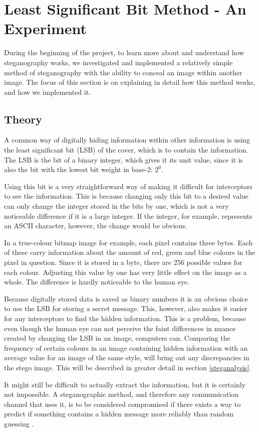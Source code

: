 \section{Least Significant Bit Method - An Experiment}
During the beginning of the project, to learn more about and understand how steganography works, we investigated and implemented a relatively simple method of steganography with the ability to conceal an image within another image.
The focus of this section is on explaining in detail how this method works, and how we implemented it.

\subsection{Theory}
A common way of digitally hiding information within other information is using the least significant bit (LSB) of the cover, which is to contain the information.
The LSB is the bit of a binary integer, which gives it its unit value, since it is also the bit with the lowest bit weight in base-2: $2^0$.

Using this bit is a very straightforward way of making it difficult for interceptors to see the information.
This is because changing only this bit to a desired value can only change the integer stored in the bits by one, which is not a very noticeable difference if it is a large integer.
If the integer, for example, represents an ASCII character, however, the change would be obvious.

In a true-colour bitmap image for example, each pixel contains three bytes.
Each of these carry information about the amount of red, green and blue colours in the pixel in question.
Since it is stored in a byte, there are 256 possible values for each colour.
Adjusting this value by one has very little effect on the image as a whole.
The difference is hardly noticeable to the human eye.

Because digitally stored data is saved as binary numbers it is an obvious choice to use the LSB for storing a secret message.
This, however, also makes it easier for any interceptors to find the hidden information.
This is a problem, because even though the human eye can not perceive the faint differences in nuance created by changing the LSB in an image, computers can.
Comparing the frequency of certain colours in an image containing hidden information with an average value for an image of the same style, will bring out any discrepancies in the stego image.
This will be described in greater detail in section \ref{steganalysis}.

It might still be difficult to actually extract the information, but it is certainly not impossible.
A steganographic method, and therefore any communication channel that uses it, is to be considered compromised if there exists a way to predict if something contains a hidden message more reliably than random guessing \citep{Bohme2004}.
